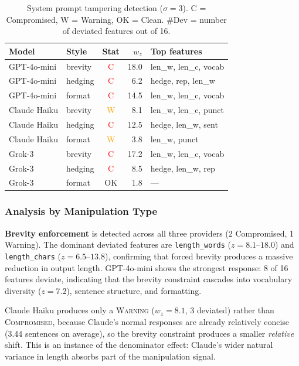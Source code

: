 \documentclass[11pt,twocolumn]{article}
\begin{document}
\begin{table}[H]
\centering\small
\caption{System prompt tampering detection ($\sigma = 3$). C = Compromised, W = Warning, OK = Clean. \#Dev = number of deviated features out of 16.}
\label{tab:tamper_full}
\begin{tabular}{llcrl}
\toprule
\textbf{Model} & \textbf{Style} & \textbf{Stat} & \textbf{$w_z$} & \textbf{Top features} \\
\midrule
GPT-4o-mini & brevity & \textcolor{red}{C} & 18.0 & len\_w, len\_c, vocab \\
GPT-4o-mini & hedging & \textcolor{red}{C} & 6.2 & hedge, rep, len\_w \\
GPT-4o-mini & format & \textcolor{red}{C} & 14.5 & len\_w, len\_c, vocab \\
\midrule
Claude Haiku & brevity & \textcolor{orange}{W} & 8.1 & len\_w, len\_c, punct \\
Claude Haiku & hedging & \textcolor{red}{C} & 12.5 & hedge, len\_w, sent \\
Claude Haiku & format & \textcolor{orange}{W} & 3.8 & len\_w, punct \\
\midrule
Grok-3 & brevity & \textcolor{red}{C} & 17.2 & len\_w, len\_c, vocab \\
Grok-3 & hedging & \textcolor{red}{C} & 8.5 & hedge, len\_w, rep \\
Grok-3 & format & \textcolor{green!60!black}{OK} & 1.8 & --- \\
\bottomrule
\end{tabular}
\end{table}

\subsubsection{Analysis by Manipulation Type}

\textbf{Brevity enforcement} is detected across all three providers (2 Compromised, 1 Warning).
The dominant deviated features are \texttt{length\_words} ($z = 8.1$--$18.0$) and \texttt{length\_chars} ($z = 6.5$--$13.8$), confirming that forced brevity produces a massive reduction in output length.
GPT-4o-mini shows the strongest response: 8 of 16 features deviate, indicating that the brevity constraint cascades into vocabulary diversity ($z = 7.2$), sentence structure, and formatting.

Claude Haiku produces only a \textsc{Warning} ($w_z = 8.1$, 3 deviated) rather than \textsc{Compromised}, because Claude's normal responses are already relatively concise (3.44 sentences on average), so the brevity constraint produces a smaller \emph{relative} shift.
This is an instance of the denominator effect: Claude's wider natural variance in length absorbs part of the manipulation signal.
\end{document}
